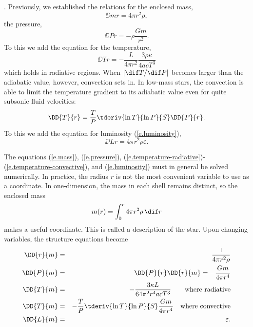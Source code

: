 . Previously, we established the relations for the enclosed mass,
\begin{equation}\label{e.mass}
\DD{m}{r} = 4\pi r^{2}\rho,
\end{equation}
the pressure,
\begin{equation}\label{e.pressure}
\DD{P}{r} = -\rho\frac{Gm}{r^{2}}.
\end{equation}
To this we add the equation for the temperature,
\begin{equation}\label{e.temperature-radiative}
\DD{T}{r} = - \frac{L}{4\pi r^{2}}\frac{3\rho\kappa}{4ac T^{3}}
\end{equation}
which holds in radiative regions. When $|\dif T/\dif P|$ becomes larger than the adiabatic value, however, convection sets in. In low-mass stars, the convection is able to limit the temperature gradient to its adiabatic value even for quite subsonic fluid velocities:
\begin{equation}
\label{e.temperature-convective}
\DD{T}{r} = \frac{T}{P}\tderiv{\ln T}{\ln P}{S}\DD{P}{r}.
\end{equation}
To this we add the equation for luminosity (\ref{e.luminosity}),
\[ \DD{L}{r} = 4\pi r^{2}\rho\varepsilon. \]

\begin{sidebar}
\label{sb.lagrangian-equations}
The equations (\ref{e.mass}), (\ref{e.pressure}), (\ref{e.temperature-radiative})-(\ref{e.temperature-convective}), and (\ref{e.luminosity}) must in general be solved numerically. In practice, the radius $r$ is not the most convenient variable to use as a coordinate. In one-dimension, the mass in each shell remains distinct, so the enclosed mass
\[
	m(r) = \int_{0}^{r} 4\pi r^{2}\rho\,\dif r
\]
makes a useful coordinate. This is called a  description of the star.  Upon changing variables, the structure equations become
\begin{eqnarray}
\DD{r}{m} &=& \frac{1}{4\pi r^{2}\rho}\label{e.lagrange-r}\\
\DD{P}{m} &=& \DD{P}{r}\DD{r}{m} = -\frac{Gm}{4\pi r^{4}}\label{e.lagrange-P}\\
\DD{T}{m} &=& - \frac{3\kappa L}{64\pi^{2} r^{4} acT^{3}}\qquad \textrm{where radiative}\label{e.lagrange-T-radiative}\\
\DD{T}{m} &=& -\frac{T}{P}\tderiv{\ln T}{\ln P}{S}\frac{Gm}{4\pi r^{4}} \quad \textrm{where convective}\label{e.lagrange-T-convective}\\
\DD{L}{m} &=& \varepsilon.\label{e.lagrange-L}
\end{eqnarray}
\end{sidebar}


